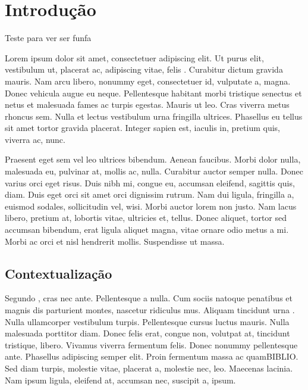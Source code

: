 %
%

\chapter{Introdu\c{c}\~{a}o}
Teste para ver ser funfa

Lorem ipsum dolor sit amet, consectetuer adipiscing elit. Ut purus elit, vestibulum ut,  placerat ac, adipiscing vitae, felis . Curabitur dictum gravida mauris. Nam arcu libero, nonummy eget, consectetuer id, vulputate a, magna. Donec vehicula augue eu neque. Pellentesque habitant morbi tristique senectus et netus et malesuada fames ac turpis egestas. Mauris ut leo. Cras viverra metus rhoncus sem. Nulla et lectus vestibulum urna fringilla ultrices. Phasellus eu tellus sit amet tortor gravida placerat. Integer sapien est, iaculis in, pretium quis, viverra ac, nunc.

Praesent eget sem vel leo ultrices bibendum. Aenean faucibus. Morbi dolor nulla, malesuada eu, pulvinar at, mollis ac, nulla. Curabitur auctor semper nulla. Donec varius orci eget risus. Duis nibh mi, congue eu, accumsan eleifend, sagittis quis, diam. Duis eget orci sit amet orci dignissim rutrum. Nam dui ligula, fringilla a, euismod sodales, sollicitudin vel, wisi. Morbi auctor lorem non justo. Nam lacus libero, pretium at, lobortis vitae, ultricies et, tellus. Donec aliquet, tortor sed accumsan bibendum, erat ligula aliquet magna, vitae ornare odio metus a mi. Morbi ac orci et nisl hendrerit mollis. Suspendisse ut massa.

\section{Contextualiza\c{c}\~{a}o}
Segundo , cras nec ante. Pellentesque a nulla. Cum sociis natoque penatibus et magnis dis parturient montes, nascetur ridiculus mus. Aliquam tincidunt urna . Nulla ullamcorper vestibulum turpis. Pellentesque cursus luctus mauris. Nulla malesuada porttitor diam. Donec felis erat, congue non, volutpat at, tincidunt tristique, libero. Vivamus viverra fermentum felis. Donec nonummy pellentesque ante. Phasellus adipiscing semper elit. Proin fermentum massa ac quamBIBLIO. Sed diam turpis, molestie vitae, placerat a, molestie nec, leo. Maecenas lacinia. Nam ipsum ligula, eleifend at, accumsan nec, suscipit a, ipsum.

